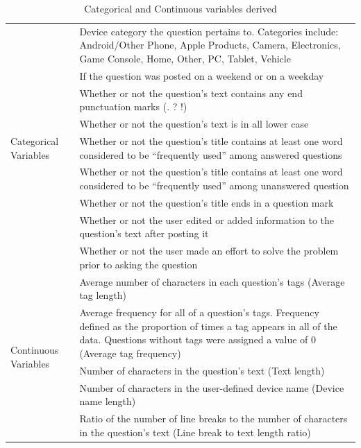 \documentclass{article}
\begin{document}
\begin{table}[!htbp]
\centering
\begin{tabular}{| p{2cm} | p{10cm} |}
  \hline
  \multirow{9}{2cm}{Categorical Variables} & Device category the question pertains to. Categories include: Android/Other Phone, Apple Products, Camera, Electronics, Game Console, Home, Other, PC, Tablet, Vehicle \\ \cline{2-2}
  & If the question was posted on a weekend or on a weekday \\ \cline{2-2}
  & Whether or not the question's text contains any end punctuation marks (. ? !) \\ \cline{2-2}
  & Whether or not the question's text is in all lower case \\ \cline{2-2}
  & Whether or not the question's title contains at least one word considered to be ``frequently used'' among answered questions \\ \cline{2-2}
  & Whether or not the question's title contains at least one word considered to be ``frequently used'' among unanswered question \\ \cline{2-2}
  & Whether or not the question's title ends in a question mark \\ \cline{2-2}
  & Whether or not the user edited or added information to the question's text after posting it \\ \cline{2-2}
  & Whether or not the user made an effort to solve the problem prior to asking the question \\ \hline
  \multirow{5}{2cm}{Continuous Variables} & Average number of characters in each question's tags (Average tag length) \\ \cline{2-2}
  & Average frequency for all of a question's tags. Frequency defined as the proportion of times a tag appears in all of the data. Questions without tags were assigned a value of 0 (Average tag frequency) \\ \cline{2-2}
  & Number of characters in the question's text (Text length) \\ \cline{2-2}
  & Number of characters in the user-defined device name (Device name length) \\ \cline{2-2}
  & Ratio of the number of line breaks to the number of characters in the question's text (Line break to text length ratio) \\ \hline
\end{tabular}
\caption{Categorical and Continuous variables derived}
\label{table:variables}
\end{table}
\end{document}
